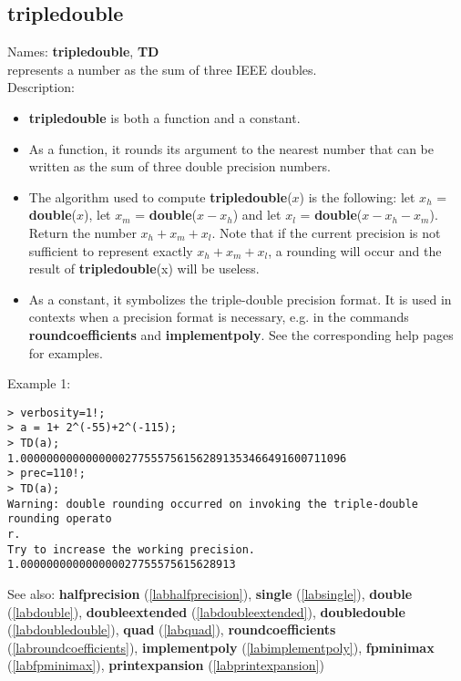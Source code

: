 \subsection{tripledouble}
\label{labtripledouble}
\noindent Names: \textbf{tripledouble}, \textbf{TD}\\
represents a number as the sum of three IEEE doubles.\\
\noindent Description: \begin{itemize}

\item \textbf{tripledouble} is both a function and a constant.

\item As a function, it rounds its argument to the nearest number that can be written
   as the sum of three double precision numbers.

\item The algorithm used to compute \textbf{tripledouble}($x$) is the following: let $x_h$ = \textbf{double}($x$),
   let $x_m$ = \textbf{double}($x-x_h$) and let $x_l$ = \textbf{double}($x-x_h-x_m$). 
   Return the number $x_h+x_m+x_l$. Note that if the
   current precision is not sufficient to represent exactly $x_h+x_m+x_l$, a rounding will
   occur and the result of \textbf{tripledouble}(x) will be useless.

\item As a constant, it symbolizes the triple-double precision format. It is used in 
   contexts when a precision format is necessary, e.g. in the commands 
   \textbf{roundcoefficients} and \textbf{implementpoly}.
   See the corresponding help pages for examples.
\end{itemize}
\noindent Example 1: 
\begin{center}\begin{minipage}{15cm}\begin{Verbatim}[frame=single]
> verbosity=1!;
> a = 1+ 2^(-55)+2^(-115);
> TD(a);
1.00000000000000002775557561562891353466491600711096
> prec=110!;
> TD(a);
Warning: double rounding occurred on invoking the triple-double rounding operato
r.
Try to increase the working precision.
1.000000000000000027755575615628913
\end{Verbatim}
\end{minipage}\end{center}
See also: \textbf{halfprecision} (\ref{labhalfprecision}), \textbf{single} (\ref{labsingle}), \textbf{double} (\ref{labdouble}), \textbf{doubleextended} (\ref{labdoubleextended}), \textbf{doubledouble} (\ref{labdoubledouble}), \textbf{quad} (\ref{labquad}), \textbf{roundcoefficients} (\ref{labroundcoefficients}), \textbf{implementpoly} (\ref{labimplementpoly}), \textbf{fpminimax} (\ref{labfpminimax}), \textbf{printexpansion} (\ref{labprintexpansion})
